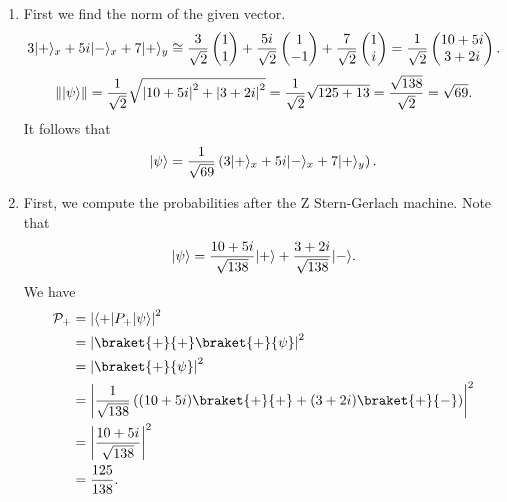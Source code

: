 \documentclass[11pt, letterpaper]{article}
\begin{document}
\begin{enumerate}
	\item First we find the norm of the given vector.
		\[
			3\lvert+\rangle_x+5i\lvert-\rangle_x+7\lvert+\rangle_y \cong \frac{3}{\sqrt{2} } \begin{pmatrix}
			1 \\
			1
			\end{pmatrix}+\frac{5i}{\sqrt{2} } \begin{pmatrix}
			1 \\
			-1
			\end{pmatrix}+\frac{7}{\sqrt{2} } \begin{pmatrix}
			1 \\
			i
			\end{pmatrix} = \frac{1}{\sqrt{2} } \begin{pmatrix}
			10+5i \\
			3+2i
			\end{pmatrix}
		.\]
		\[
			\left\| \lvert\psi \rangle  \right\| = \frac{1}{\sqrt{2} } \sqrt{\left| 10+5i \right|^2+\left| 3+2i \right|^2} =\frac{1}{\sqrt{2} } \sqrt{125+13} =\frac{\sqrt{138} }{\sqrt{2} } =\sqrt{69} 
		.\]
	It follows that
	\[
		\lvert\psi\rangle  = \frac{1}{\sqrt{69} } \left( 3\lvert+\rangle_x+5i\lvert-\rangle_x+7\lvert+\rangle_y \right) 
	.\]
	\item First, we compute the probabilities after the Z Stern-Gerlach machine. Note that
		\[
			\lvert\psi \rangle= \frac{10+5i}{\sqrt{138} } \lvert+\rangle+\frac{3+2i}{\sqrt{138} } \lvert-\rangle
		.\]
		We have
		\begin{align*}
			\mathcal{P}_+&= \left| \bra{+}P_+ \ket{\psi } \right| ^2\\
				     &=\left| \braket{+}{+}\braket{+}{\psi } \right| ^2\\
				     &=\left| \braket{+}{\psi } \right| ^2\\
				     &=\left| \frac{1}{\sqrt{138} } \left( (10+5i)\braket{+}{+}+(3+2i)\braket{+}{-} \right)  \right| ^2\\
				     &=\left| \frac{10+5i}{\sqrt{138} }  \right| ^2\\
				     &=\frac{125}{138} 
		.\end{align*}
		

\end{enumerate}
\end{document}

